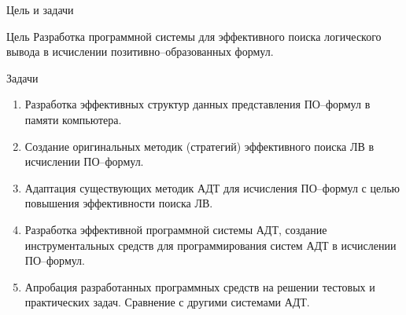 \documentclass{beamer}
\begin{document}
\begin{frame}{Цель и задачи}

\begin{block}{Цель}
Разработка программной системы для эффективного поиска логического вывода в исчислении позитивно--образованных формул.
\end{block}

\begin{block}{Задачи}
\begin{enumerate}
\item Разработка эффективных структур данных представления ПО--формул в памяти компьютера.
\item Создание оригинальных методик (стратегий) эффективного поиска ЛВ в исчислении ПО--формул.
\item Адаптация существующих методик АДТ для исчисления ПО--формул с целью повышения эффективности поиска ЛВ.
\item Разработка эффективной программной системы АДТ, создание инструментальных средств для программирования систем АДТ в исчислении ПО--формул.
\item Апробация разработанных программных средств на решении тестовых и практических задач. Сравнение с другими системами АДТ.
\end{enumerate}
\end{block}

\end{frame}
\end{document}
